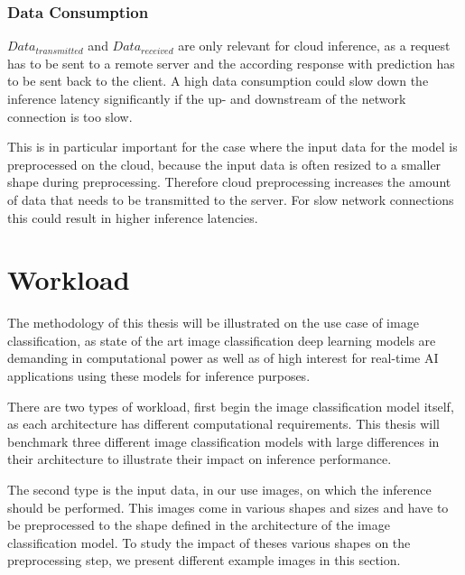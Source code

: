 \subsubsection{Data Consumption}
$Data_{transmitted}$ and $Data_{received}$ are only relevant for cloud inference, as a request has to be sent to a remote server and the according response with prediction has to be sent back to the client. A high data consumption could slow down the inference latency significantly if the up- and downstream of the network connection is too slow. 

This is in particular important for the case where the input data for the model is preprocessed on the cloud, because the input data is often resized to a smaller shape during preprocessing. Therefore cloud preprocessing increases the amount of data that needs to be transmitted to the server. For slow network connections this could result in higher inference latencies.



\section{Workload}
\label{chap:workload}
The methodology of this thesis will be illustrated on the use case of image classification, as state of the art image classification deep learning models are demanding in computational power as well as of high interest for real-time AI applications using these models for inference purposes.

There are two types of workload, first begin the image classification model itself, as each architecture has different computational requirements.
This thesis will benchmark three different image classification models with large differences in their architecture to illustrate their impact on inference performance.

The second type is the input data, in our use images, on which the inference should be performed.
This images come in various shapes and sizes and have to be preprocessed to the shape defined in the architecture of the image classification model.
To study the impact of theses various shapes on the preprocessing step, we present different example images in this section.

